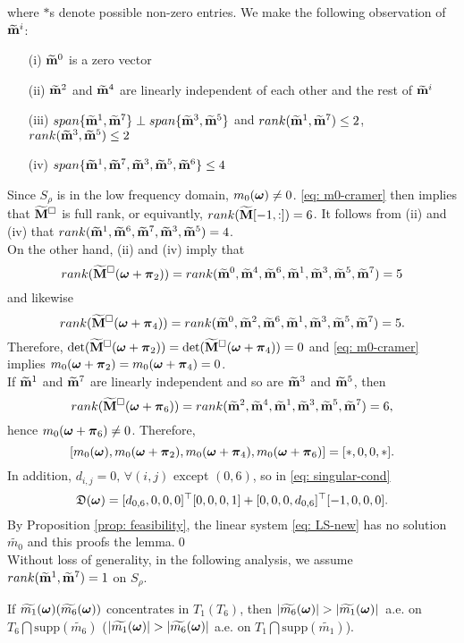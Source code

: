 where $*$s denote possible non-zero entries.
We make the following observation of $\mrow{i}$:
\begin{itemize}
\item[(i)] $\mrow{0}$ is a zero vector
\item[(ii)] $\mrow{2}$ and $\mrow{4}$ are linearly independent of each other and the rest of $\mrow{i}$
\item[(iii)] $span\{\mrow{1},\mrow{7}\} \perp span\{\mrow{3},\mrow{5}\}$ and $rank(\mrow{1},\mrow{7}) \leq 2$, \\$rank(\mrow{3},\mrow{5})\leq 2$
\item[(iv)] $span\{\mrow{1}, \mrow{7}, \mrow{3},\mrow{5},\mrow{6}\} \leq 4$
\end{itemize}
Since $S_\rho$ is in the low frequency domain, $m_0(\V{\omega})\neq 0$. \eqref{eq: m0-cramer} then implies that $\Msub$ is full rank, or equivantly, $rank(\M[-1,:]) = 6$. It follows from  (ii) and (iv) that $rank(\mrow{1},\mrow{6},\mrow{7},\mrow{3},\mrow{5})= 4$.\\
On the other hand, (ii) and (iv) imply that $$rank(\Msub(\V{\omega}+\V{\pi}_2))=rank(\mrow{0},\mrow{4},\mrow{6},\mrow{1},\mrow{3},\mrow{5},\mrow{7})= 5$$ and likewise $$rank(\Msub(\V{\omega}+\V{\pi}_4))=rank(\mrow{0},\mrow{2},\mrow{6},\mrow{1},\mrow{3},\mrow{5},\mrow{7})= 5.$$ Therefore, $\det(\Msub(\V{\omega} + \V{\pi}_2)) = \det(\Msub(\V{\omega} + \V{\pi}_4)) = 0$ and \eqref{eq: m0-cramer} implies $m_0(\V{\omega}+\V{\pi}_2) = m_0(\V{\omega}+\V{\pi}_4) = 0$.\\
If $\mrow{1}$ and $\mrow{7}$ are linearly independent and so are $\mrow{3}$ and $\mrow{5}$, then $$rank(\Msub(\V{\omega}+\V{\pi}_6))=rank(\mrow{2},\mrow{4},\mrow{1},\mrow{3},\mrow{5},\mrow{7}) = 6,$$ hence $m_0(\V{\omega}+\V{\pi}_6)\neq 0$. Therefore, $$[m_0(\V{\omega}),m_0(\V{\omega}+\V{\pi}_2),m_0(\V{\omega}+\V{\pi}_4),m_0(\V{\omega}+\V{\pi}_6)] = [*,0,0,*].$$ In addition, $d_{i,j} = 0,\, \forall(i,j)$ except $(0,6)$, so in \eqref{eq: singular-cond} $$\mathfrak{D}(\V{\omega}) = [d_{0,6}, 0, 0,0]^\top [0,0,0,1] + [0,0,0,d_{0,6}]^\top [-1,0,0,0].$$  By Proposition \ref{prop: feasibility}, the linear system \eqref{eq: LS-new} has no solution $\widetilde{m_0}$ and this proofs the lemma.\qed\\[.5em]
Without loss of generality, in the following analysis, we assume $rank(\mrow{1},\mrow{7}) = 1$ on $S_\rho$.
\begin{lemma}\label{lem: concentrate}
If $\m{1} (\m{6})$ concentrates in $T_1 (T_6)$, then $|\m{6}| > |\m{1}|\,$ a.e. on $T_6\bigcap \text{supp}(\widetilde{m_6})$ ($|\m{1}| > |\m{6}|$ 
a.e. on $T_1\bigcap\text{supp}(\widetilde{m_1})$).
\end{lemma}
